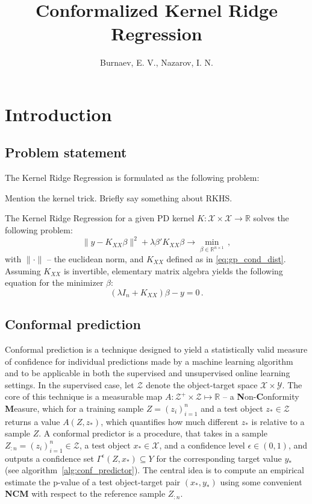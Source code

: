 \documentclass{ITaSconf}
\title{Conformalized Kernel Ridge Regression}
\author{Burnaev, E. V., Nazarov, I. N.}
\newcommand{\Xcal}{\mathcal{X}}
\newcommand{\Ycal}{\mathcal{Y}}
\newcommand{\Zcal}{\mathcal{Z}}
\newcommand{\Real}{\mathbb{R}}
\begin{document}
\maketitle

\section{Introduction} %
\label{sec:introduction}

\subsection{Problem statement} %
\label{sub:problem_statement}

The Kernel Ridge Regression is formulated as the following problem:

Mention the kernel trick.
Briefly say something about RKHS.

The Kernel Ridge Regression for a given PD kernel $K:\Xcal\times \Xcal \to \Real$
solves the following problem:
\begin{equation*}
  \|y - K_{XX}\beta\|^2 + \lambda \beta' K_{XX} \beta
    \to \min_{\beta\in \Real^{n\times 1}}
    \,,
\end{equation*}
with $\|\cdot\|$ -- the euclidean norm, and $K_{XX}$ defined as in \ref{eq:gp_cond_dist}.
Assuming $K_{XX}$ is invertible, elementary matrix algebra yields the following
equation for the minimizer $\beta$:
\begin{equation*}
  (\lambda I_n + K_{XX}) \beta - y = 0 \,.
\end{equation*}


\subsection{Conformal prediction} %
\label{sub:conformal_prediction}

Conformal prediction is a technique designed to yield a statistically valid measure
of confidence for individual predictions made by a machine learning algorithm and
to be applicable in both the supervised and unsupervised online learning settings.
In the supervised case, let $\Zcal$ denote the object-target space $\Xcal \times \Ycal$.
The core of this technique is a measurable map $A: \Zcal^+\times \Zcal \mapsto \Real$
-- a \textbf{N}on-\textbf{C}onformity \textbf{M}easure, which for a training sample
$Z = (z_i)_{i=1}^n$ and a test object $z_*\in \Zcal$ returns a value $A(Z, z_*)$,
which quantifies how much different $z_*$ is relative to a sample $Z$. A conformal
predictor is a procedure, that takes in a sample $Z_{:n}=(z_i)_{i=1}^n\in\Zcal$,
a test object $x_*\in\Xcal$, and a confidence level $\epsilon\in(0,1)$, and outputs
a confidence set $\Gamma^\epsilon(Z, x_*) \subseteq Y$ for the corresponding target
value $y_*$ (see algorithm~\ref{alg:conf_predictor}). The central idea is to compute
an empirical estimate the p-value of a test object-target pair $(x_*, y_*)$ using
some convenient \textbf{NCM} with respect to the reference sample $Z_{:n}$.
\end{document}
